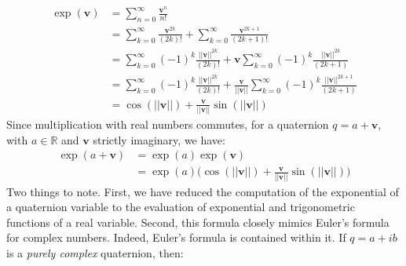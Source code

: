 \documentclass{article}
\theoremstyle{plain}
\theoremstyle{normal}
\begin{document}
            \begin{subequations}
                \begin{align}
                    \exp(\mathbf{v})
                    &=\sum_{n=0}^{\infty}\frac{\mathbf{v}^{n}}{n!}\\
                    &=\sum_{k=0}^{\infty}\frac{\mathbf{v}^{2k}}{(2k)!}
                        +\sum_{k=0}^{\infty}\frac{\mathbf{v}^{2k+1}}{(2k+1)!}\\
                    &=\sum_{k=0}^{\infty}
                        (-1)^{k}\frac{||\mathbf{v}||^{2k}}{(2k)!}
                        +\mathbf{v}
                        \sum_{k=0}^{\infty}(-1)^{k}
                            \frac{||\mathbf{v}||^{2k}}{(2k+1)}\\
                    &=\sum_{k=0}^{\infty}
                        (-1)^{k}\frac{||\mathbf{v}||^{2k}}{(2k)!}
                        +\frac{\mathbf{v}}{||\mathbf{v}||}
                        \sum_{k=0}^{\infty}(-1)^{k}
                            \frac{||\mathbf{v}||^{2k+1}}{(2k+1)}\\
                    &=\cos(||\mathbf{v}||)+
                        \frac{\mathbf{v}}{||\mathbf{v}||}\sin(||\mathbf{v}||)
                \end{align}
            \end{subequations}
            Since multiplication with real numbers commutes, for a
            quaternion $q=a+\mathbf{v}$, with $a\in\mathbb{R}$ and
            $\mathbf{v}$ strictly imaginary, we have:
            \begin{subequations}
                \label{eqn:exp_quaternion_formula}
                \begin{align}
                    \exp(a+\mathbf{v})
                    &=\exp(a)\exp(\mathbf{v})\\
                    &=\exp(a)\Big(
                        \cos(||\mathbf{v}||)+
                        \frac{\mathbf{v}}{||\mathbf{v}||}
                        \sin(||\mathbf{v}||)
                    \Big)
                \end{align}
            \end{subequations}
            Two things to note. First, we have reduced the computation of the
            exponential of a quaternion variable to the evaluation of
            exponential and trigonometric functions of a real variable.
            Second, this formula closely mimics Euler's formula for complex
            numbers. Indeed, Euler's formula is contained within it. If
            $q=a+ib$ is a \textit{purely complex} quaternion, then:
\end{document}
